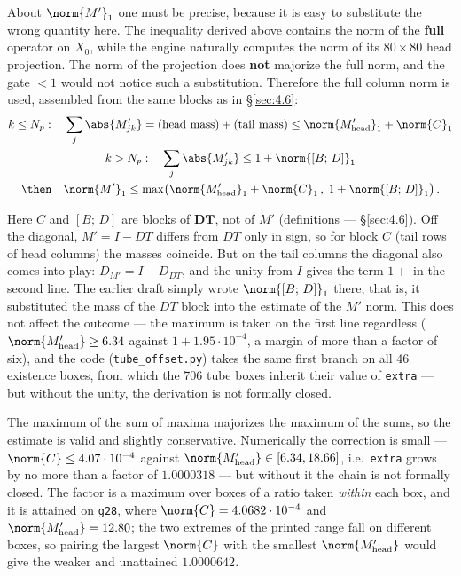 About $\norm{M'}_{1}$ one must be precise, because it is easy to substitute the
wrong quantity here. The inequality derived above contains the norm of the
\textbf{full} operator on $X_{0}$, while the engine naturally computes the norm of
its $80\times 80$ head projection. The norm of the projection does \textbf{not}
majorize the full norm, and the gate $< 1$ would not notice such a
substitution. Therefore the full column norm is used, assembled from the
same blocks as in \S\ref{sec:4.6}:
\begin{gather*}
k \le N_p:\quad \sum_j \abs{M'_{jk}} = \text{(head mass)} + \text{(tail mass)} \le \norm{M'_{\mathrm{head}}}_{1} + \norm{C}_{1} \\
k > N_p:\quad \sum_j \abs{M'_{jk}} \le 1 + \norm{[B;\,D]}_{1} \\
\then\quad \norm{M'}_{1} \le \max\bigl( \norm{M'_{\mathrm{head}}}_{1} + \norm{C}_{1}\,,\; 1 + \norm{[B;\,D]}_{1} \bigr)\,.
\end{gather*}

Here $C$ and $[B;\,D]$ are blocks of $\mathbf{DT}$, not of $M'$ (definitions ---
\S\ref{sec:4.6}). Off the diagonal, $M' = I - DT$ differs from $DT$ only in sign, so
for block $C$ (tail rows of head columns) the masses coincide. But on the
tail columns the diagonal also comes into play: $D_{M'} = I - D_{DT}$, and
the unity from $I$ gives the term $1 +$ in the second line. The earlier
draft simply wrote $\norm{[B;\,D]}_{1}$ there, that is, it substituted the mass of
the $DT$ block into the estimate of the $M'$ norm. This does not affect
the outcome --- the maximum is taken on the first line regardless
($\norm{M'_{\mathrm{head}}} \ge 6.34$ against $1 + 1.95\cdot 10^{-4}$, a margin of more than a
factor of six), and the code (\texttt{tube\_\allowbreak offset.py}) takes the same first
branch on all 46 existence boxes, from which the 706 tube boxes inherit their
value of \texttt{extra} --- but without the unity, the derivation is not
formally closed.

The maximum of the sum of maxima majorizes the maximum of the sums, so the
estimate is valid and slightly conservative. Numerically the correction is
small --- $\norm{C} \le 4.07\cdot 10^{-4}$ against $\norm{M'_{\mathrm{head}}} \in [6.34, 18.66]$, i.e.\ \texttt{extra}
grows by no more than a factor of $1.0000318$ --- but without it the chain
is not formally closed. The factor is a maximum over boxes of a ratio taken
\emph{within} each box, and it is attained on \texttt{g28}, where
$\norm{C} = 4.0682\cdot 10^{-4}$ and $\norm{M'_{\mathrm{head}}} = 12.80$; the two
extremes of the printed range fall on different boxes, so pairing the largest
$\norm{C}$ with the smallest $\norm{M'_{\mathrm{head}}}$ would give the weaker and
unattained $1.0000642$.

